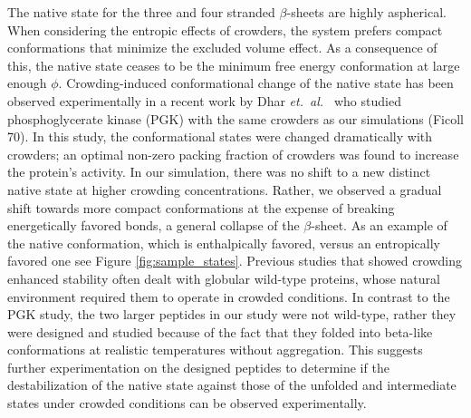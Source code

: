 The native state for the three and four stranded $\beta$-sheets are highly aspherical. When considering the entropic effects of crowders, the system prefers compact conformations that minimize the excluded volume effect. As a consequence of this, the native state ceases to be the minimum free energy conformation at large enough $\phi$. Crowding-induced conformational change of the native state has been observed experimentally in a recent work by Dhar \textit{et.\ al.\ }\cite{dhar_structure_2010} who studied phosphoglycerate kinase (PGK) with the same crowders as our simulations (Ficoll 70). In this study, the conformational states were changed dramatically with crowders; an optimal non-zero packing fraction of crowders was found to increase the protein's activity. In our simulation, there was no shift to a new distinct native state at higher crowding concentrations. Rather, we observed a gradual shift towards more compact conformations at the expense of breaking energetically favored bonds, a general collapse of the $\beta$-sheet. As an example of the native conformation, which is enthalpically favored, versus an entropically favored one see Figure \ref{fig:sample_states}. Previous studies that showed crowding enhanced stability often dealt with globular wild-type proteins, whose natural environment required them to operate in crowded conditions. In contrast to the PGK study, the two larger peptides in our study were not wild-type, rather they were designed and studied because of the fact that they folded into beta-like conformations at realistic temperatures without aggregation. This suggests further experimentation on the designed peptides to determine if the destabilization of the native state against those of the unfolded and intermediate states under crowded conditions can be observed experimentally. 
